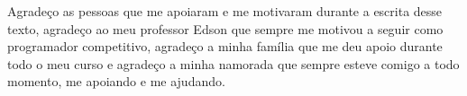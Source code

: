 \begin{agradecimentos}

    Agradeço as pessoas que me apoiaram e me motivaram durante a escrita desse texto, agradeço ao meu professor Edson que sempre me motivou a seguir como programador competitivo, agradeço a minha família que me deu apoio durante todo o meu curso e agradeço a minha namorada que sempre esteve comigo a todo momento, me apoiando e me ajudando.

\end{agradecimentos}
